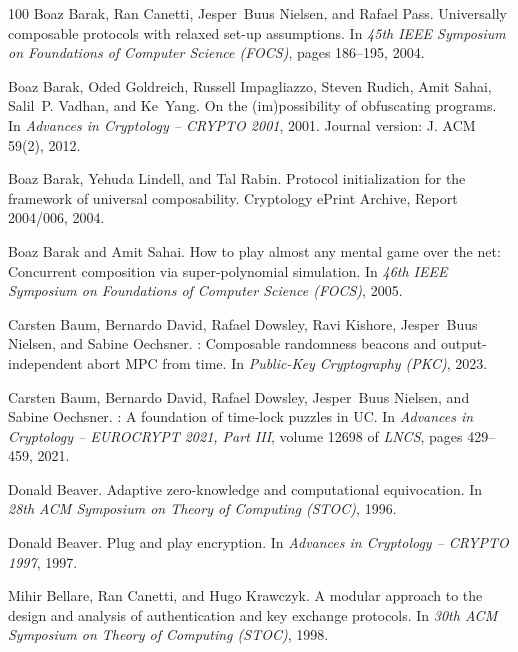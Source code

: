 \documentclass[11pt,a4paper]{article}
\begin{document}
\begin{thebibliography}{100}
Boaz Barak, Ran Canetti, Jesper~Buus Nielsen, and Rafael Pass.
\newblock Universally composable protocols with relaxed set-up assumptions.
\newblock In {\em 45th IEEE Symposium on Foundations of Computer Science
  (FOCS)}, pages 186--195, 2004.

Boaz Barak, Oded Goldreich, Russell Impagliazzo, Steven Rudich, Amit Sahai,
  Salil~P. Vadhan, and Ke~Yang.
\newblock On the (im)possibility of obfuscating programs.
\newblock In {\em Advances in Cryptology -- CRYPTO 2001}, 2001.
\newblock Journal version: J. ACM 59(2), 2012.

Boaz Barak, Yehuda Lindell, and Tal Rabin.
\newblock Protocol initialization for the framework of universal composability.
\newblock Cryptology ePrint Archive, Report 2004/006, 2004.

Boaz Barak and Amit Sahai.
\newblock How to play almost any mental game over the net: Concurrent
  composition via super-polynomial simulation.
\newblock In {\em 46th IEEE Symposium on Foundations of Computer Science
  (FOCS)}, 2005.

Carsten Baum, Bernardo David, Rafael Dowsley, Ravi Kishore, Jesper~Buus
  Nielsen, and Sabine Oechsner.
: Composable randomness beacons and output-independent abort
  {MPC} from time.
\newblock In {\em Public-Key Cryptography (PKC)}, 2023.

Carsten Baum, Bernardo David, Rafael Dowsley, Jesper~Buus Nielsen, and Sabine
  Oechsner.
: A foundation of time-lock puzzles in {UC}.
\newblock In {\em Advances in Cryptology -- EUROCRYPT 2021, Part III}, volume
  12698 of {\em LNCS}, pages 429--459, 2021.

Donald Beaver.
\newblock Adaptive zero-knowledge and computational equivocation.
\newblock In {\em 28th ACM Symposium on Theory of Computing (STOC)}, 1996.

Donald Beaver.
\newblock Plug and play encryption.
\newblock In {\em Advances in Cryptology -- CRYPTO 1997}, 1997.

Mihir Bellare, Ran Canetti, and Hugo Krawczyk.
\newblock A modular approach to the design and analysis of authentication and
  key exchange protocols.
\newblock In {\em 30th ACM Symposium on Theory of Computing (STOC)}, 1998.


\end{thebibliography}
\end{document}
